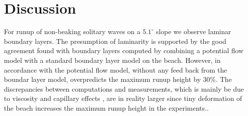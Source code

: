 \documentclass[review]{elsarticle}
\begin{document}
 
 
 
\section{Discussion}
\label{con_rem}

For runup of non-beaking solitary waves on a $5.1^\circ$ slope we 
observe laminar boundary layers. The presumption of laminarity is
 supported by the good agreement found with boundary layers computed 
by combining a potential flow model with a standard boundary layer model on the beach. However, in accordance with \cite{pedersen2013runp} the
potential flow model, without any feed back from the boundar layer model, overpredicts the
maximum runup height by  30\%.  
The discrepancies between computations and measurements, which is mainly be due to viscosity and capillary effects , are in  reality larger since tiny deformation of the beach increases the maximum runup height in the experiments.. 
\end{document}
